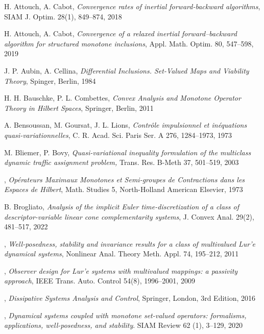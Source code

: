 \documentclass[11pt]{article}
\theoremstyle{plain}
\begin{document}
{\begin{thebibliography}{}
   {\sc  H. Attouch, A. Cabot}, {\it Convergence rates of inertial forward-backward algorithms}, SIAM J. Optim. 28(1), 849--874, 2018

 { \sc H. Attouch, A. Cabot}, {\it Convergence of a relaxed inertial forward--backward algorithm for structured monotone inclusions}, Appl. Math. Optim. 80, 547--598, 2019

 {\sc J. P. Aubin, A. Cellina}, {\it Differential Inclusions. Set-Valued Maps and Viability Theory}, Spinger, Berlin, 1984

   {\sc H. H. Bauschke, P. L. Combettes}, { \it Convex Analysis and Monotone Operator
Theory in Hilbert Spaces}, Springer, Berlin, 2011

  {\sc A. Bensoussan, M. Goursat, J. L. Lions},   {\it Contr\^ole impulsionnel et in\'equations quasi-variationnelles}, C. R. Acad. Sci.
Paris Ser. A 276, 1284--1973, 1973

   {\sc  M. Bliemer, P. Bovy},  {\it Quasi-variational inequality formulation of the multiclass dynamic traffic assignment
problem,} Trans. Res.  B-Meth 37, 501--519, 2003

, {\it Op\'{e}rateurs Maximaux Monotones et Semi-groupes de Contractions dans
les Espaces de Hilbert}, Math. Studies 5, North-Holland American Elsevier, 1973

 { \sc B. Brogliato}, {\it Analysis of the implicit Euler time-discretization of a class of
descriptor-variable linear cone complementarity systems}, J. Convex Anal. 29(2), 481--517, 2022

,  {\it Well-posedness, stability and invariance results for a class of multivalued Lur'e dynamical systems}, Nonlinear Anal. Theory Meth. Appl.  74, 195--212, 2011

,  {\it Observer design for Lur'e systems with multivalued mappings: a passivity approach}, IEEE Trans. Auto. Control 54(8), 1996--2001, 2009

, {\it Dissipative Systems Analysis and Control}, Springer, London, 3rd Edition, 2016 

, {\it Dynamical systems coupled with monotone set-valued operators: formalisms, applications, well-posedness, and stability}. SIAM Review 62 (1), 3--129, 2020



\end{thebibliography}}
\end{document}
